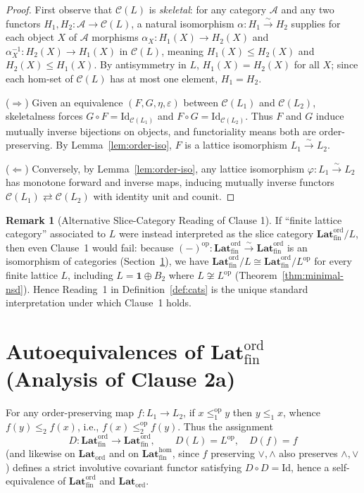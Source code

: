 \documentclass[11pt]{article}
\theoremstyle{definition}
\newtheorem{remark}[theorem]{Remark}
\newcommand{\CatC}{\mathcal{C}}
\newcommand{\LatOrd}{\mathbf{Lat}_{\mathrm{ord}}}
\newcommand{\FinLatOrd}{\mathbf{Lat}_{\mathrm{fin}}^{\mathrm{ord}}}
\newcommand{\FinLatHom}{\mathbf{Lat}_{\mathrm{fin}}^{\mathrm{hom}}}
\newcommand{\Id}{\mathrm{Id}}
\newcommand{\op}{\mathrm{op}}
\begin{document}
\begin{proof}
First observe that $\CatC(L)$ is \emph{skeletal}: for any category $\mathcal{A}$
and any two functors $H_1, H_2 : \mathcal{A} \to \CatC(L)$, a natural
isomorphism $\alpha : H_1 \xrightarrow{\sim} H_2$ supplies for each object $X$
of $\mathcal{A}$ morphisms $\alpha_X : H_1(X) \to H_2(X)$ and
$\alpha_X^{-1} : H_2(X) \to H_1(X)$ in $\CatC(L)$, meaning $H_1(X) \le H_2(X)$
and $H_2(X) \le H_1(X)$. By antisymmetry in $L$, $H_1(X) = H_2(X)$ for all $X$;
since each hom-set of $\CatC(L)$ has at most one element, $H_1 = H_2$.

($\Rightarrow$) Given an equivalence $(F, G, \eta, \varepsilon)$ between
$\CatC(L_1)$ and $\CatC(L_2)$, skeletalness forces $G \circ F = \Id_{\CatC(L_1)}$
and $F \circ G = \Id_{\CatC(L_2)}$. Thus $F$ and $G$ induce mutually inverse
bijections on objects, and functoriality means both are order-preserving. By
Lemma~\ref{lem:order-iso}, $F$ is a lattice isomorphism $L_1 \xrightarrow{\sim} L_2$.

($\Leftarrow$) Conversely, by Lemma~\ref{lem:order-iso}, any lattice isomorphism
$\varphi : L_1 \xrightarrow{\sim} L_2$ has monotone forward and inverse maps,
inducing mutually inverse functors $\CatC(L_1) \rightleftarrows \CatC(L_2)$ with
identity unit and counit.
\end{proof}

\begin{remark}[Alternative Slice-Category Reading of Clause 1]
If ``finite lattice category'' associated to $L$ were instead interpreted as the
slice category $\FinLatOrd / L$, then even Clause~1 would fail: because
$(-)^{\op} : \FinLatOrd \xrightarrow{\sim} \FinLatOrd$ is an isomorphism of
categories (Section~\ref{sec:global}), we have
$\FinLatOrd / L \cong \FinLatOrd / L^{\op}$ for every finite lattice $L$,
including $L = \mathbf{1} \oplus B_2$ where $L \not\cong L^{\op}$
(Theorem~\ref{thm:minimal-nsd}). Hence Reading~1 in Definition~\ref{def:cats}
is the unique standard interpretation under which Clause~1 holds.
\end{remark}

\section{Autoequivalences of \texorpdfstring{$\FinLatOrd$}{FinLatOrd} (Analysis of Clause 2a)}
\label{sec:global}

For any order-preserving map $f : L_1 \to L_2$, if $x \le_1^{\op} y$ then
$y \le_1 x$, whence $f(y) \le_2 f(x)$, i.e., $f(x) \le_2^{\op} f(y)$. Thus the
assignment
\[
  D : \FinLatOrd \to \FinLatOrd, \qquad D(L) = L^{\op}, \quad D(f) = f
\]
(and likewise on $\LatOrd$ and on $\FinLatHom$, since $f$ preserving $\vee,
\wedge$ also preserves $\wedge, \vee$) defines a strict involutive covariant
functor satisfying $D \circ D = \Id$, hence a self-equivalence of $\FinLatOrd$
and $\LatOrd$.
\end{document}
